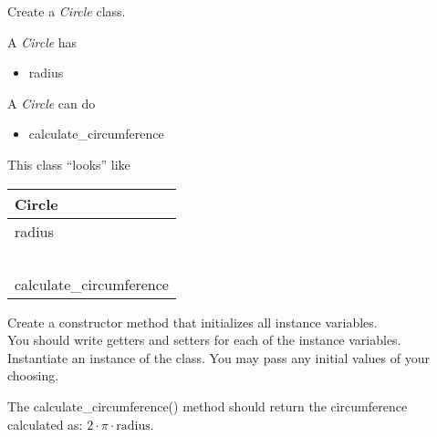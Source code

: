 	\item Create a \textit{Circle} class.\\	
	\begin{minipage}{.6\textwidth}
		A \textit{Circle} has
		\begin{itemize}
			\item radius 
		\end{itemize}

		A \textit{Circle} can do
		\begin{itemize}
			\item calculate\_circumference
		\end{itemize}
	\end{minipage}
	\begin{minipage}{.4\textwidth}
		This class ``looks'' like 
				
		\vspace*{1em}
		\begin{tabular}{|l|}
			\hline Circle\\ \hline
			radius\\ \ \\  \hline
			calculate\_circumference\\ \hline
		\end{tabular}
	\end{minipage}

	\vspace*{2ex}
	Create a constructor method that initializes all instance variables.\\
	You should write getters and setters for each of the instance variables.\\
	Instantiate an instance of the class. You may pass any initial values of your choosing.	

	The calculate\_circumference() method should return the circumference calculated as: $2 \cdot \pi \cdot \text{radius}$.\\





